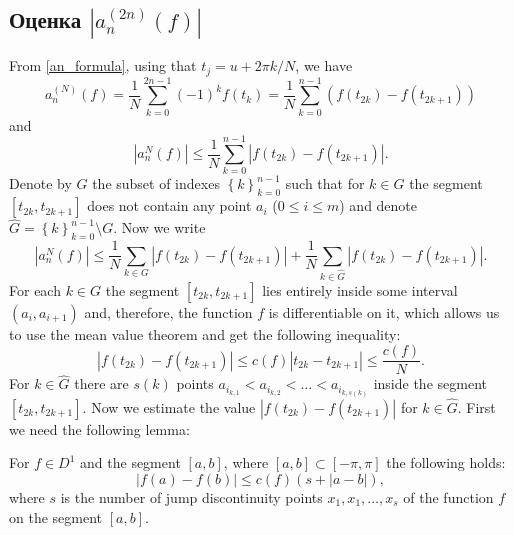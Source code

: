 \subsection{Оценка $|a_{n}^{(2n)}(f)|$}
From \eqref{an_formula}, using that $t_j=u+2\pi k / N$, we have
\begin{equation*}
a_{n}^{(N)}(f) = \frac{1}{N} \sum_{k=0}^{2n-1} (-1)^k f(t_k)  = 
\frac{1}{N} \sum_{k=0}^{n-1} \left(f(t_{2k}) - f(t_{2k+1})\right)
\end{equation*}
and
\begin{equation*}
\left|a_{n}^{N}(f)\right| \leq \frac{1}{N} \sum_{k=0}^{n-1} \left| f(t_{2k}) - f(t_{2k+1}) \right|.
\end{equation*}
Denote by $G$ the subset of indexes $\left\{k\right\}_{k=0}^{n-1}$ such that for $k \in G$ the segment $[t_{2k}, t_{2k+1}]$ does not contain any point $a_i$ ($0 \leq i \leq m$) and denote 
$\hat{G} = \left\{k\right\}_{k=0}^{n-1} \setminus G$. 
Now we write
\begin{equation}\label{ak_estimate}
\left|a_{n}^{N}(f)\right| \leq \frac{1}{N} \sum_{k \in G} \left| f(t_{2k}) - f(t_{2k+1}) \right| + \frac{1}{N} \sum_{k \in \hat{G}} \left| f(t_{2k}) - f(t_{2k+1}) \right|.
\end{equation}
For each $k \in G$ the segment $[t_{2k}, t_{2k+1}]$ lies entirely inside some interval $(a_i, a_{i+1})$ and, therefore, the function $f$ is differentiable on it, which allows us to use the mean value theorem and get the following inequality:
\begin{equation} \label{ftk_G_estimate}
\left| f(t_{2k}) - f(t_{2k+1}) \right| \leq c(f) \left| t_{2k} - t_{2k+1} \right| \leq \frac{c(f)}{N}.
\end{equation}
For $k \in \hat{G}$ there are $s(k)$ points $a_{i_{k,1}} < a_{i_{k,2}} < \ldots < a_{i_{k,s(k)}}$ inside the segment $[t_{2k}, t_{2k+1}]$. 
Now we estimate the value $\left|f(t_{2k}) - f(t_{2k+1})\right|$ for $k \in \hat{G}$. First we need the following lemma:
\begin{lemma}
	For $f \in D^1$ and the segment $[a,b]$, where  $[a,b] \subset [-\pi, \pi]$ the following holds:
	\begin{equation*}
	\left|f(a) - f(b)\right| \leq c(f)(s + |a - b|),
	\end{equation*}
	where
	$s$ is the number of jump discontinuity points $x_1,x_1,\ldots, x_s$ of the function $f$ on the segment $[a,b]$.
\end{lemma}
